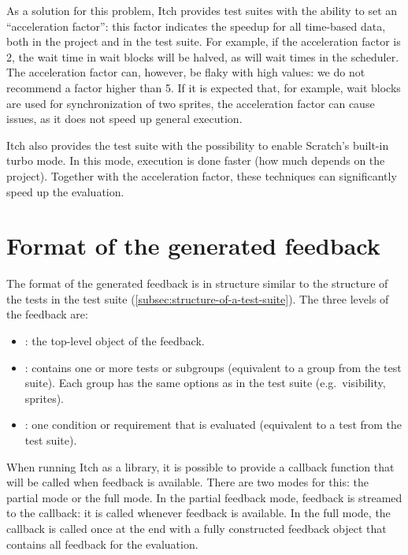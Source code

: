 \documentclass[../main]{subfiles}
\begin{document}
As a solution for this problem, Itch provides test suites with the ability to set an ``acceleration factor'': this factor indicates the speedup for all time-based data, both in the project and in the test suite.
For example, if the acceleration factor is 2, the wait time in wait blocks will be halved, as will wait times in the scheduler.
The acceleration factor can, however, be flaky with high values: we do not recommend a factor higher than 5.
If it is expected that, for example, wait blocks are used for synchronization of two sprites, the acceleration factor can cause issues, as it does not speed up general execution.

Itch also provides the test suite with the possibility to enable Scratch's built-in turbo mode.
In this mode, execution is done faster (how much depends on the project).
Together with the acceleration factor, these techniques can significantly speed up the evaluation.

\section{Format of the generated feedback}\label{sec:format-of-the-generated-feedback}

The format of the generated feedback is in structure similar to the structure of the tests in the test suite (\cref{subsec:structure-of-a-test-suite}).
The three levels of the feedback are:

\begin{itemize}[nosep]
    \item {}: the top-level object of the feedback.
    \item {}: contains one or more tests or subgroups (equivalent to a group from the test suite).
        Each group has the same options as in the test suite (e.g.\ visibility, sprites).
    \item {}: one condition or requirement that is evaluated (equivalent to a test from the test suite).
\end{itemize}

When running Itch as a library, it is possible to provide a callback function that will be called when feedback is available.
There are two modes for this: the partial mode or the full mode.
In the partial feedback mode, feedback is streamed to the callback: it is called whenever feedback is available.
In the full mode, the callback is called once at the end with a fully constructed feedback object that contains all feedback for the evaluation.
\end{document}
